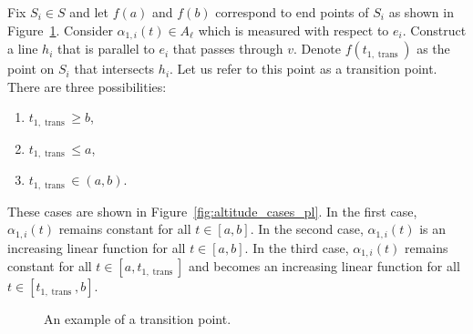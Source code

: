 \documentclass[../main.tex]{subfiles}
\begin{document}
Fix $S_i\in S$ and let $f(a)$ and $f(b)$ correspond to end points of $S_i$ as shown in Figure~\ref{fig:transition_point}. Consider $\alpha_{1,i}(t)\in A_{\ell}$ which is measured with respect to $e_i$. Construct a line $h_{i}$ that is parallel to $e_i$ that passes through $v$. Denote $f(t_{1,\operatorname{trans}})$ as the point on $S_i$ that intersects $h_i$. Let us refer to this point as a transition point. There are three possibilities:
\begin{enumerate}
	\item $t_{1,\operatorname{trans}}\geq b$,
	\item $t_{1,\operatorname{trans}}\leq a$,
	\item $t_{1,\operatorname{trans}}\in(a,b)$.
\end{enumerate} 
These cases are shown in Figure~\ref{fig:altitude_cases_pl}. In the first case, $\alpha_{1,i}(t)$ remains constant for all $t\in[a,b]$. In the second case, $\alpha_{1,i}(t)$ is an increasing linear function for all $t\in[a,b]$. In the third case, $\alpha_{1,i}(t)$ remains constant for all $t\in[a,t_{1,\operatorname{trans}}]$ and becomes an increasing linear function for all $t\in[t_{1,\operatorname{trans}},b]$.


\begin{figure}
	\centering
	
	\caption{An example of a transition point.}
	\label{fig:transition_point}
\end{figure}
\end{document}
